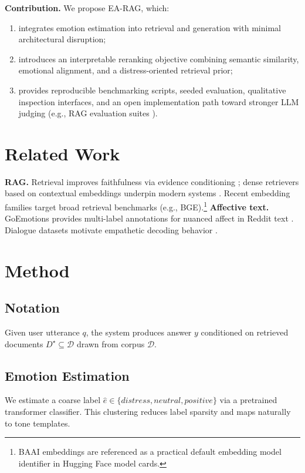 \documentclass[conference]{IEEEtran}
\begin{document}
\textbf{Contribution.} We propose EA-RAG, which:
\begin{enumerate}
  \item integrates emotion estimation into retrieval and generation with minimal architectural disruption;
  \item introduces an interpretable reranking objective combining semantic similarity, emotional alignment, and a distress-oriented retrieval prior;
  \item provides reproducible benchmarking scripts, seeded evaluation, qualitative inspection interfaces, and an open implementation path toward stronger LLM judging (e.g., RAG evaluation suites \cite{ragas2023}).
\end{enumerate}

\section{Related Work}
\textbf{RAG.} Retrieval improves faithfulness via evidence conditioning \cite{lewis2020rag}; dense retrievers based on contextual embeddings underpin modern systems \cite{reimers2019sentencebert}. Recent embedding families target broad retrieval benchmarks (e.g., BGE).\footnote{BAAI embeddings are referenced as a practical default embedding model identifier in Hugging Face model cards.}
\textbf{Affective text.} GoEmotions provides multi-label annotations for nuanced affect in Reddit text \cite{demszky2020goemotions}. Dialogue datasets motivate empathetic decoding behavior \cite{rashkin2019empdialogues}.

\section{Method}
\subsection{Notation}
Given user utterance $q$, the system produces answer $y$ conditioned on retrieved documents $D^\star \subseteq \mathcal{D}$ drawn from corpus $\mathcal{D}$.

\subsection{Emotion Estimation}
We estimate a coarse label $\hat{e} \in \{\textit{distress},\textit{neutral},\textit{positive}\}$ via a pretrained transformer classifier. This clustering reduces label sparsity and maps naturally to tone templates.
\end{document}
